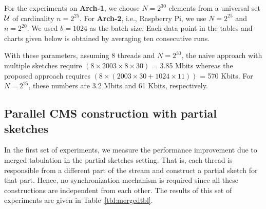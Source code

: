 \documentclass[10pt, conference, compsocconf]{IEEEtran}
\begin{document}
For the experiments on {\bf Arch-1}, we choose $N = 2^{30}$ elements from a universal set $\cal U$ of cardinality $n = 2^{25}$. For {\bf Arch-2}, i.e., Raspberry Pi, we use $N = 2^{25}$ and $n = 2^{20}$. We used $b = 1024$ as the batch size. Each data point in the tables and charts given below is obtained by averaging ten consecutive runs. 

With these parameters, assuming 8 threads and $N = 2^{30}$, the naive approach with multiple sketches require $(8 \times 2003 \times 8 \times 30)$ = 3.85 Mbits whereas the proposed approach requires $(8 \times (2003 \times 30 + 1024 \times 11))$ = 570 Kbits. For $N = 2^{25}$, these numbers are 3.2 Mbits and 61 Kbits, respectively.

\subsection{Parallel CMS construction with partial sketches}

In the first set of experiments, we measure the performance improvement due to merged tabulation in the partial sketches setting. That is, each thread is responsible from a different part of the stream and construct a partial sketch for that part. Hence, no synchronization mechanism is required since all these constructions are independent from each other. The results of this set of experiments are given in Table~\ref{tbl:mergedtbl}. 
\end{document}
